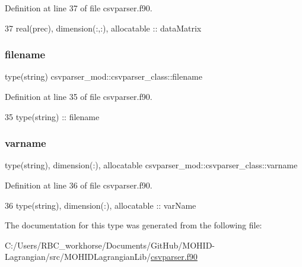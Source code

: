 Definition at line 37 of file csvparser.\+f90.


\begin{DoxyCode}
37         \textcolor{keywordtype}{real(prec)}, \textcolor{keywordtype}{dimension(:,:)}, \textcolor{keywordtype}{allocatable} :: dataMatrix
\end{DoxyCode}
\mbox{\label{structcsvparser__mod_1_1csvparser__class_aa3632225cd36ea1ad9e8c0493a218886}} 
\subsubsection{\texorpdfstring{filename}{filename}}
{\footnotesize\ttfamily type(string) csvparser\+\_\+mod\+::csvparser\+\_\+class\+::filename\hspace{0.3cm}{\ttfamily [private]}}



Definition at line 35 of file csvparser.\+f90.


\begin{DoxyCode}
35         \textcolor{keywordtype}{type}(string) :: filename
\end{DoxyCode}
\mbox{\label{structcsvparser__mod_1_1csvparser__class_acad38d37d73d0cb6ca80f98cde3d56b4}} 
\subsubsection{\texorpdfstring{varname}{varname}}
{\footnotesize\ttfamily type(string), dimension(\+:), allocatable csvparser\+\_\+mod\+::csvparser\+\_\+class\+::varname\hspace{0.3cm}{\ttfamily [private]}}



Definition at line 36 of file csvparser.\+f90.


\begin{DoxyCode}
36         \textcolor{keywordtype}{type}(string), \textcolor{keywordtype}{dimension(:)}, \textcolor{keywordtype}{allocatable} :: varName
\end{DoxyCode}


The documentation for this type was generated from the following file\+:\begin{DoxyCompactItemize}
\item 
C\+:/\+Users/\+R\+B\+C\+\_\+workhorse/\+Documents/\+Git\+Hub/\+M\+O\+H\+I\+D-\/\+Lagrangian/src/\+M\+O\+H\+I\+D\+Lagrangian\+Lib/\mbox{\hyperlink{csvparser_8f90}{csvparser.\+f90}}\end{DoxyCompactItemize}
